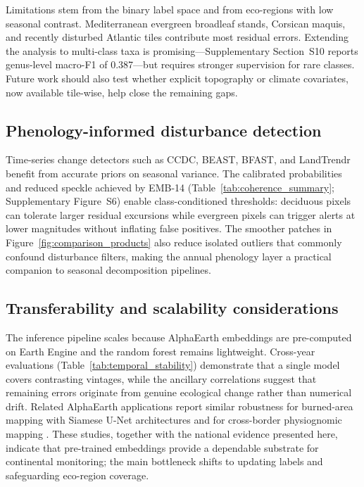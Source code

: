 \documentclass[utf8]{FrontiersinHarvard}
\begin{document}
Limitations stem from the binary label space and from eco-regions with low seasonal contrast. Mediterranean evergreen broadleaf stands, Corsican maquis, and recently disturbed Atlantic tiles contribute most residual errors. Extending the analysis to multi-class taxa is promising—Supplementary Section~S10 reports genus-level macro-F1 of 0.387—but requires stronger supervision for rare classes. Future work should also test whether explicit topography or climate covariates, now available tile-wise, help close the remaining gaps.

\subsection{Phenology-informed disturbance detection}
Time-series change detectors such as CCDC, BEAST, BFAST, and LandTrendr \citep{Zhu2014,Zhao2019,Verbesselt2010a,Verbesselt2010b,Kennedy2010,Kennedy2018} benefit from accurate priors on seasonal variance. The calibrated probabilities and reduced speckle achieved by EMB-14 (Table~\ref{tab:coherence_summary}; Supplementary Figure~S6) enable class-conditioned thresholds: deciduous pixels can tolerate larger residual excursions while evergreen pixels can trigger alerts at lower magnitudes without inflating false positives. The smoother patches in Figure~\ref{fig:comparison_products} also reduce isolated outliers that commonly confound disturbance filters, making the annual phenology layer a practical companion to seasonal decomposition pipelines.

\subsection{Transferability and scalability considerations}
The inference pipeline scales because AlphaEarth embeddings are pre-computed on Earth Engine and the random forest remains lightweight. Cross-year evaluations (Table~\ref{tab:temporal_stability}) demonstrate that a single model covers contrasting vintages, while the ancillary correlations suggest that remaining errors originate from genuine ecological change rather than numerical drift. Related AlphaEarth applications report similar robustness for burned-area mapping with Siamese U-Net architectures \citep{Seydi2025AlphaEarthBurnedArea} and for cross-border physiognomic mapping \citep{Houriez2025AEFDataGen}. These studies, together with the national evidence presented here, indicate that pre-trained embeddings provide a dependable substrate for continental monitoring; the main bottleneck shifts to updating labels and safeguarding eco-region coverage.
\end{document}

